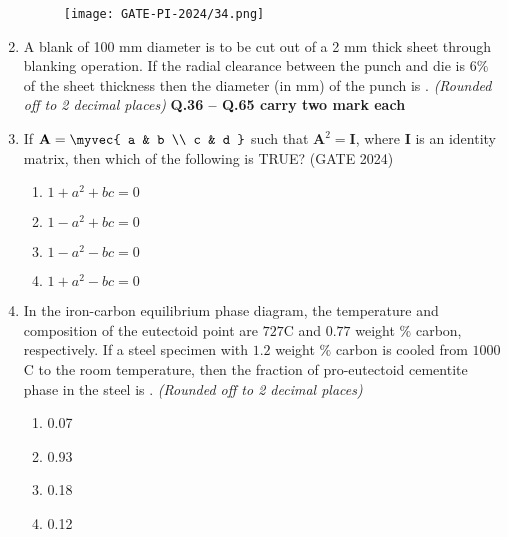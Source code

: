 \documentclass[journal,12pt,onecolumn]{IEEEtran}
\theoremstyle{remark}
\begin{document}
\begin{enumerate}
\begin{figure}[H]
    \centering
    \texttt{[image: GATE-PI-2024/34.png]}
    \caption{}
    \label{34}
\end{figure}
\vspace{1cm}

\item A blank of 100 mm diameter is to be cut out of a 2 mm thick sheet through blanking operation. If the radial clearance between the punch and die is $6\%$ of the sheet thickness then the diameter (in mm) of the punch is \underline{\hspace{2cm}}. \textit{(Rounded off to 2 decimal places)}
\vspace{1cm}
\newpage
\textbf{Q.36 -- Q.65 carry two mark each}
\vspace{1cm}
\item If $\mathbf{A} = \myvec{ a & b \\ c & d }$ such that $\mathbf{A}^2 = \mathbf{I}$, where $\mathbf{I}$ is an identity matrix, then which of the following is TRUE?
\hfill{(GATE 2024)}
\begin{multicols}{4}
\begin{enumerate}
    \item $1 + a^2 + bc = 0$
    \item $1 - a^2 + bc = 0$
    \item $1 - a^2 - bc = 0$
    \item $1 + a^2 - bc = 0$
\end{enumerate}
\end{multicols}
\vspace{1cm}

\item In the iron-carbon equilibrium phase diagram, the temperature and composition of the eutectoid point are $727$C and $0.77$ weight $\%$ carbon, respectively. If a steel specimen with $1.2$ weight $\%$ carbon is cooled from $1000$C to the room temperature, then the fraction of pro-eutectoid cementite phase in the steel is \underline{\hspace{2cm}}. \textit{(Rounded off to 2 decimal places)}
\begin{multicols}{4}
\begin{enumerate}
    \item 0.07
    \item 0.93
    \item 0.18
    \item 0.12
\end{enumerate}
\end{multicols}
\vspace{1cm}


\end{enumerate}
\end{document}
